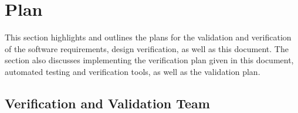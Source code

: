 \documentclass[12pt, titlepage]{article}
\begin{document}


\section{Plan}
This section highlights and outlines the plans for the validation and verification of the software requirements, design verification, as well as this document. The section also discusses implementing the verification plan given in this document, automated testing and verification tools, as well as the validation plan.

\subsection{Verification and Validation Team}
\end{document}
